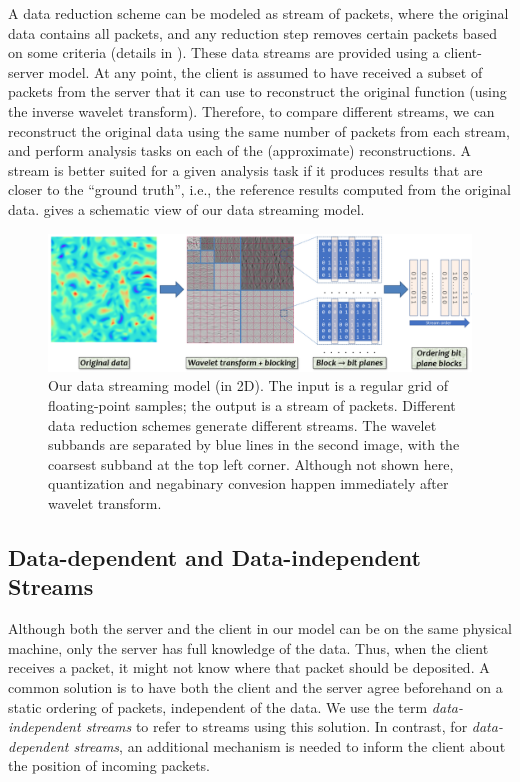 A data reduction scheme can be modeled as stream of packets, where the original data contains all
packets, and any reduction step removes certain packets based on some criteria (details in
).  These data streams are provided using a client-server model. At
any point, the client is assumed to have received a subset of packets from the server that it can
use to reconstruct the original function (using the inverse wavelet transform). Therefore, to
compare different streams, we can reconstruct the original data using the same number of packets
from each stream, and perform analysis tasks on each of the (approximate) reconstructions. A stream
is better suited for a given analysis task if it produces results that are closer to the ``ground
truth'', i.e., the reference results computed from the original data.  gives a
schematic view of our data streaming model.

\begin{figure}[h]
\centering
\includegraphics[width=\linewidth]{img/pipeline.png}
\caption{Our data streaming model (in 2D). The input is a regular grid of floating-point samples;
the output is a stream of packets. Different data reduction schemes generate different streams.  The
wavelet subbands are separated by blue lines in the second image, with the coarsest subband at the
top left corner. Although not shown here, quantization and negabinary convesion happen immediately
after wavelet transform. }\label{fig:pipeline}
\end{figure}

\subsection{Data-dependent and Data-independent Streams} \label{sec:static-dynamic-streams}

Although both the server and the client in our model can be on the same physical machine, only the
server has full knowledge of the data. Thus, when the client receives a packet, it might not know
where that packet should be deposited. A common solution is to have both the client and the server
agree beforehand on a static ordering of packets, independent of the data. We use the term
\emph{data-independent streams} to refer to streams using this solution. In contrast, for
\emph{data-dependent streams}, an additional mechanism is needed to inform the client about the
position of incoming packets.

